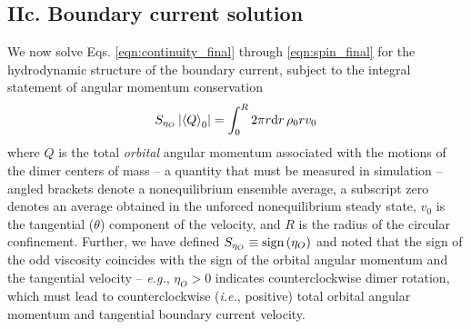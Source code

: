 \documentclass[%
 reprint,
superscriptaddress,
longbibliography,
 amsmath,amssymb,
 prl,
 citeautoscript,
]{revtex4-1}
\begin{document}
\subsection{IIc. Boundary current solution}

We now solve Eqs. \ref{eqn:continuity_final} through \ref{eqn:spin_final} for the hydrodynamic structure of the boundary current, subject to the integral statement of angular momentum conservation
\begin{equation}
S_{\eta_O} \left| \left\langle Q \right\rangle_0 \right| = \int_0^R 2 \pi r {\rm d} r \, \rho_0 r v_0
\label{eqn:orbital}
\end{equation}
where $Q$ is the total {\it orbital} angular momentum associated with the motions of the dimer centers of mass -- a quantity that must be measured in simulation -- angled brackets denote a nonequilibrium ensemble average, a subscript zero denotes an average obtained in the unforced nonequilibrium steady state, $v_0$ is the tangential ($\theta$) component of the velocity, and $R$ is the radius of the circular confinement. Further, we have defined $S_{\eta_O} \equiv {\rm sign} \left( \eta_O \right)$ and noted that the sign of the odd viscosity coincides with the sign of the orbital angular momentum and the tangential velocity -- {\it e.g.}, $\eta_O > 0$ indicates counterclockwise dimer rotation, which must lead to counterclockwise ({\it i.e.}, positive) total orbital angular momentum and tangential boundary current velocity.
\end{document}
